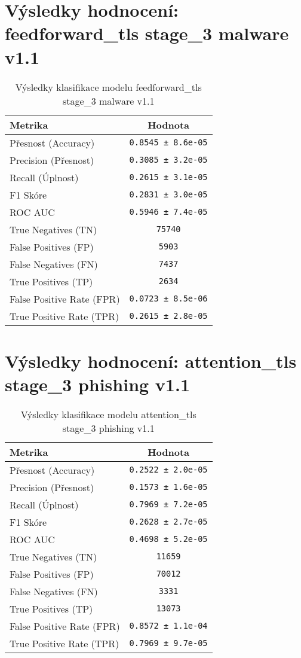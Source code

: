 \section*{Výsledky hodnocení: feedforward_tls stage_3 malware v1.1}
\begin{table}[h!]
\centering
\begin{tabular}{|l|c|}
\hline
\textbf{Metrika} & \textbf{Hodnota} \\
\hline
Přesnost (Accuracy) & \texttt{0.8545 ± 8.6e-05} \\
Precision (Přesnost) & \texttt{0.3085 ± 3.2e-05} \\
Recall (Úplnost) & \texttt{0.2615 ± 3.1e-05} \\
F1 Skóre & \texttt{0.2831 ± 3.0e-05} \\
ROC AUC & \texttt{0.5946 ± 7.4e-05} \\
True Negatives (TN) & \texttt{75740} \\
False Positives (FP) & \texttt{5903} \\
False Negatives (FN) & \texttt{7437} \\
True Positives (TP) & \texttt{2634} \\
False Positive Rate (FPR) & \texttt{0.0723 ± 8.5e-06} \\
True Positive Rate (TPR) & \texttt{0.2615 ± 2.8e-05} \\
\hline
\end{tabular}
\caption{Výsledky klasifikace modelu feedforward_tls stage_3 malware v1.1}
\label{tab:malware_feedforward_tls}
\end{table}

\section*{Výsledky hodnocení: attention_tls stage_3 phishing v1.1}
\begin{table}[h!]
\centering
\begin{tabular}{|l|c|}
\hline
\textbf{Metrika} & \textbf{Hodnota} \\
\hline
Přesnost (Accuracy) & \texttt{0.2522 ± 2.0e-05} \\
Precision (Přesnost) & \texttt{0.1573 ± 1.6e-05} \\
Recall (Úplnost) & \texttt{0.7969 ± 7.2e-05} \\
F1 Skóre & \texttt{0.2628 ± 2.7e-05} \\
ROC AUC & \texttt{0.4698 ± 5.2e-05} \\
True Negatives (TN) & \texttt{11659} \\
False Positives (FP) & \texttt{70012} \\
False Negatives (FN) & \texttt{3331} \\
True Positives (TP) & \texttt{13073} \\
False Positive Rate (FPR) & \texttt{0.8572 ± 1.1e-04} \\
True Positive Rate (TPR) & \texttt{0.7969 ± 9.7e-05} \\
\hline
\end{tabular}
\caption{Výsledky klasifikace modelu attention_tls stage_3 phishing v1.1}
\label{tab:phishing_attention_tls}
\end{table}

